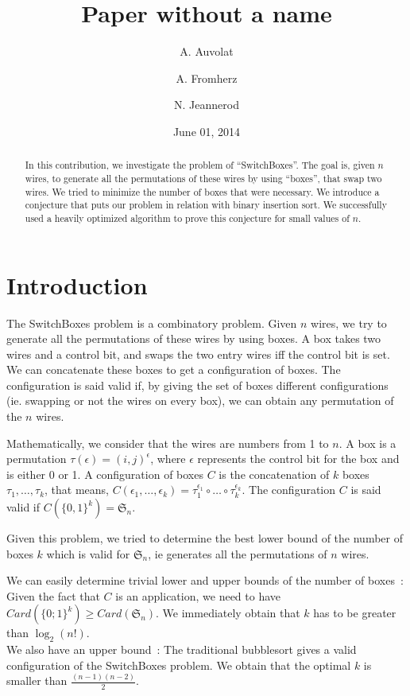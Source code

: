 \documentclass[11pt, a4paper]{article}
\begin{document}
\title{ Paper without a name }
\author{A. Auvolat \and A. Fromherz \and N. Jeannerod }
\date{June 01, 2014}
\maketitle

\begin{abstract}

In this contribution, we investigate the problem of ``SwitchBoxes''.  The goal is,
given $n$ wires, to generate all the permutations of these wires by using
``boxes'', that swap two wires. We tried to minimize the number of boxes that were
necessary.  We introduce a conjecture that puts our problem in relation with
binary insertion sort.  We successfully used a heavily optimized algorithm to
prove this conjecture for small values of $n$.

\end{abstract}

\section{Introduction}

The SwitchBoxes problem is a combinatory problem. Given $n$ wires, we try to
generate all the permutations of these wires by using boxes.  A box takes two
wires and a control bit, and swaps the two entry wires iff the control bit is
set. We can concatenate these boxes to get a configuration of boxes.  The
configuration is said valid if, by giving the set of boxes different
configurations (ie. swapping or not the wires on every box), we can obtain any
permutation of the $n$ wires.

Mathematically, we consider that the wires are numbers from 1 to $n$. A box is a
permutation $\tau(\epsilon) = (i,j)^{\epsilon}$, where $\epsilon$ represents the
control bit for the box and is either 0 or 1.  A configuration of boxes $C$ is
the concatenation of $k$ boxes $\tau_1, \ldots, \tau_k$, that means,
$C(\epsilon_1, \ldots, \epsilon_k) =
\tau_1^{\epsilon_1}\circ\ldots\circ\tau_k^{\epsilon_k}$.  The configuration $C$
is said valid if $C(\{0,1\}^k)= \mathfrak{S}_n$.

Given this problem, we tried to determine the best lower bound of the number of
boxes $k$ which is valid for $\mathfrak{S}_n$, ie generates all the permutations of $n$
wires.

We can easily determine trivial lower and upper bounds of the number of
boxes~:\\ Given the fact that $C$ is an application, we need to have
$Card(\{0;1\}^{k}) \geq Card(\mathfrak{S}_n)$. We immediately obtain that $k$
has to be greater than $\log_2(n!)$.\\ We also have an upper bound~: The
traditional bubblesort gives a valid configuration of the SwitchBoxes problem. We
obtain that the optimal $k$ is smaller than $\frac{(n-1)(n-2)}{2}$.
\end{document}
